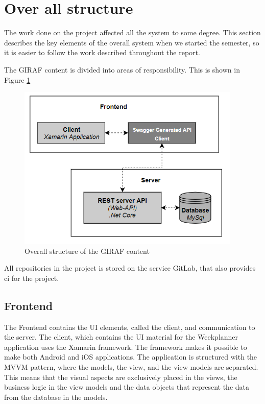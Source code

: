 \section{Over all structure}

The work done on the project affected all the system to some degree. This section describes the key elements of the overall system when we started the semester, so it is easier to follow the work described throughout the report. 

The GIRAF content is divided into areas of responsibility. This is shown in Figure \ref{fig:ProductStructure}

\begin{figure}[H]
    \begin{center}
        \includegraphics[width=0.95\textwidth]{figures/ProductStructure.png}
    \end{center}
    \caption{Overall structure of the GIRAF content}
    \label{fig:ProductStructure}
\end{figure}

All repositories in the project is stored on the service GitLab, that also provides \gls{ci} for the project. 

\subsection{Frontend}
The Frontend contains the UI elements, called the client, and communication to the server. The client, which contains the UI material for the Weekplanner application uses the Xamarin framework. The framework makes it possible to make both Android and iOS applications. The application is structured with the MVVM pattern, where the models, the view, and the view models are separated. This means that the visual aspects are exclusively placed in the views, the business logic in the view models and the data objects that represent the data from the database in the models.

